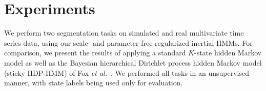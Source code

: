 \documentclass[letterpaper]{article}
\makeatletter
\def\BState{\State\hskip-\ALG@thistlm}
\makeatother
\begin{document}
\begin{algorithm}
\caption{}
\label{alg:incremental}
\end{algorithm}

%
%
\section{Experiments}\label{sec:Experiments}

We perform two segmentation tasks on simulated and real multivariate time series data, using our scale- and parameter-free regularized inertial HMMs. For comparison, we present the results of applying a standard $K$-state hidden Markov model as well as the Bayesian hierarchical Dirichlet process hidden Markov model (sticky HDP-HMM) of Fox \emph{et al.}~\cite{fox2011sticky}. We performed all tasks in an unsupervised manner, with state labels being used only for evaluation.
\end{document}
